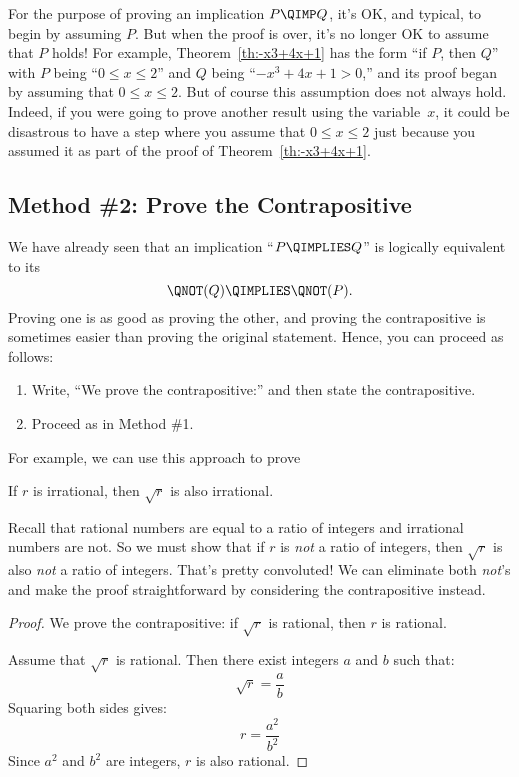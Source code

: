 For the purpose of proving an implication $P \QIMP Q$, it's OK, and
typical, to begin by assuming $P$.  But when the proof is over, it's
no longer OK to assume that $P$ holds!  For example,
Theorem~\ref{th:-x3+4x+1} has the form ``if $P$, then $Q$'' with $P$
being ``$0 \le x \le 2$'' and $Q$ being ``$-x^3 + 4x + 1 > 0$,'' and
its proof began by assuming that $0 \le x \le 2$.  But of course this
assumption does not always hold.  Indeed, if you were going to prove
another result using the variable~$x$, it could be disastrous to have
a step where you assume that $0 \le x \le 2$ just because you assumed
it as part of the proof of Theorem~\ref{th:-x3+4x+1}.

\subsection{Method \#2: Prove the Contrapositive}\label{sec:contrapositive}

We have already seen that an implication ``$P \QIMPLIES Q$'' is
logically equivalent to its 
\[
\QNOT(Q) \QIMPLIES \QNOT(P).
\]
Proving one is as good as proving the other, and proving the
contrapositive is sometimes easier than proving the original statement.
Hence, you can proceed as follows:
%
\begin{enumerate}
\item Write, ``We prove the contrapositive:'' and then state the
contrapositive.
\item Proceed as in Method \#1.
\end{enumerate}

For example, we can use this approach to prove
\begin{theorem}
If $r$ is irrational, then $\sqrt{r}$ is also irrational.
\end{theorem}

Recall that rational numbers are equal to a ratio of integers and
irrational numbers are not.  So we must show that if $r$ is \textit{not} a
ratio of integers, then $\sqrt{r}$ is also \textit{not} a ratio of
integers.  That's pretty convoluted!  We can eliminate both \emph{not}'s
and make the proof straightforward by considering the contrapositive
instead.

\begin{proof}
We prove the contrapositive: if $\sqrt{r}$ is rational, then $r$ is
rational.

Assume that $\sqrt{r}$ is rational.  Then there exist integers $a$ and $b$
such that:
%
\[
\sqrt{r} = \frac{a}{b}
\]
%
Squaring both sides gives:
%
\[
r  = \frac{a^2}{b^2}
\]
%
Since $a^2$ and $b^2$ are integers, $r$ is also rational.
\end{proof}

